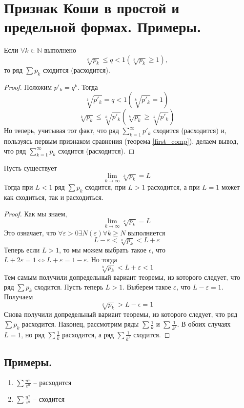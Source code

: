 \section{Признак Коши в простой и предельной формах. Примеры.}
\begin{theorem}
    Если $\forall k \in \mathbb{N}$ выполнено
    \[
        \sqrt[k]{p_k} \leqslant q < 1
        \left(
            \sqrt[k]{p_k} \geqslant 1
        \right)
        ,
    \] то ряд $\sum p_k$ сходится (расходится).
    \begin{proof}
        Положим $p'_k = q^k$. Тогда
        \[
            \sqrt[k]{p'_k} = q < 1
            \left(
                \sqrt[k]{p'_k} = 1
            \right)
        \]
        \[
            \sqrt[k]{p_k} \leqslant
            \sqrt[k]{p'_k}
            \left(
                \sqrt[k]{p_k} \geqslant
                \sqrt[k]{p'_k}
            \right)
        \]
        Но теперь, учитывая тот факт, что ряд $\sum_{k=1}^{\infty} p'_k$ сходится (расходится) и, пользуясь первым признаком сравнения (теорема \ref{first_comp}), делаем вывод, что ряд $\sum_{k=1}^{\infty} p_k$ сходится (расходится).
    \end{proof}
\end{theorem}

\begin{theorem}
    Пусть существует
    \[
        \lim_{k \to \infty} \sqrt[k]{p_k} = L
    \]
    Тогда при $L < 1$ ряд $\sum p_k$ сходится, при $L > 1$ расходится, а при $L = 1$ может как сходиться, так и расходиться.
    \begin{proof}
        Как мы знаем,
        \[
            \lim_{k \to \infty} \sqrt[k]{p_k} = L
        \]
        Это означает, что $\forall \varepsilon > 0 \exists N(\varepsilon) \forall k \geqslant N$ выполняется
        \[
            L - \varepsilon < \sqrt[k]{p_k} < L + \varepsilon
        \]
        Теперь если $L > 1$, то мы можем выбрать такое $\epsilon$, что $L + 2 \varepsilon = 1 \Leftrightarrow L + \varepsilon = 1 - \varepsilon$. Но тогда
        \[
            \sqrt[k]{p_k} < L + \varepsilon < 1
        \]
        Тем самым получили допредельный вариант теоремы, из которого следует, что ряд $\sum p_k$ сходится.
        \newline
        Пусть теперь $L > 1$. Выберем такое $\varepsilon$, что $L - \varepsilon = 1$. Получаем
        \[
            \sqrt[k]{p_k} > L - \epsilon = 1
        \]
        Снова получили допредельный вариант теоремы, из которого следует, что ряд $\sum p_k$ расходится.
        \newline
        Наконец, рассмотрим ряды $\sum \frac{1}{k}$ и $\sum \frac{1}{k^2}$. В обоих случаях $L=1$, но ряд $\sum \frac{1}{k}$ расходится, а ряд $\sum \frac{1}{k^2}$ сходится.
    \end{proof}
\end{theorem}

\subsection{Примеры.}
\begin{enumerate}
    \item $\sum \frac{n^n}{e^n}$ -- расходится
    \item $\sum \frac{n^2}{e^n}$ -- сходится
\end{enumerate}